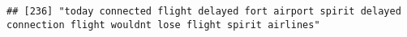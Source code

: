 \documentclass[
]{article}
\begin{document}
\begin{verbatim}
## [236] "today connected flight delayed fort airport spirit delayed connection flight wouldnt lose flight spirit airlines"                                                                                                                                                                                                                                                                                                                                                                                                                                                                                                                                                                                                                                                                                                                                                                                                                                                                                                                                                                                                                                                                                                                                                                                                                                                                                                                                                                                                                                                                                                                                                                                                                                                                              

\end{verbatim}
\end{document}

